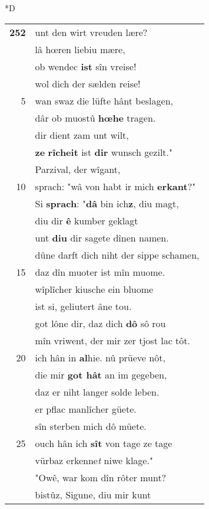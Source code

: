 \documentclass[8pt,a4paper,notitlepage]{article}
\begin{document}
\begin{table}[ht]
\begin{minipage}[t]{0.5\linewidth}
\small
\begin{center}*D
\end{center}
\begin{tabular}{rl}
\textbf{252} & unt den wirt vreuden lære?\\ 
 & lâ hœren liebiu mære,\\ 
 & ob wendec \textbf{ist} sîn vreise!\\ 
 & wol dich der sælden reise!\\ 
5 & wan swaz die lüfte hânt beslagen,\\ 
 & dâr ob muostû \textbf{hœhe} tragen.\\ 
 & dir dient zam unt wilt,\\ 
 & \textbf{ze} \textbf{rîcheit} ist \textbf{dir} wunsch gezilt."\\ 
 & Parzival, der wîgant,\\ 
10 & sprach: "wâ von habt ir mich \textbf{erkant}?"\\ 
 & Si \textbf{sprach}: "\textbf{dâ} bin ich\textbf{z}, diu magt,\\ 
 & diu dir \textbf{ê} kumber geklagt\\ 
 & unt \textbf{diu} dir sagete dînen namen.\\ 
 & dûne darft dich niht der sippe schamen,\\ 
15 & daz dîn muoter ist mîn muome.\\ 
 & wîplîcher kiusche ein bluome\\ 
 & ist si, geliutert âne tou.\\ 
 & got lône dir, daz dich \textbf{dô} sô rou\\ 
 & mîn vriwent, der mir zer tjost lac tôt.\\ 
20 & ich hân in \textbf{al}hie. nû prüeve nôt,\\ 
 & die mir \textbf{got hât} an im gegeben,\\ 
 & daz er niht langer solde leben.\\ 
 & er pflac manlîcher güete.\\ 
 & sîn sterben mich dô müete.\\ 
25 & ouch hân ich \textbf{sît} von tage ze tage\\ 
 & vürbaz erkenne\textit{t} niwe klage."\\ 
 & "Owê, war kom dîn rôter munt?\\ 
 & bistûz, Sigune, diu mir kunt\\ 

\end{tabular}
\end{minipage}
\end{table}
\end{document}
